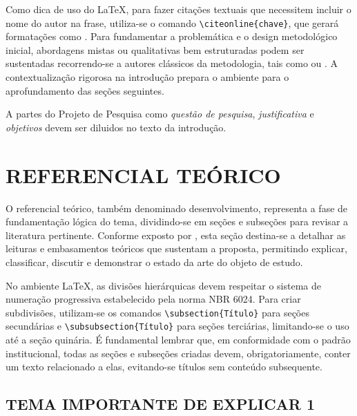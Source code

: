 Como dica de uso do LaTeX, para fazer citações textuais que necessitem incluir o nome do autor na frase, utiliza-se o comando \verb|\citeonline{chave}|, que gerará formatações como . Para fundamentar a problemática e o design metodológico inicial, abordagens mistas ou qualitativas bem estruturadas podem ser sustentadas recorrendo-se a autores clássicos da metodologia, tais como  ou . A contextualização rigorosa na introdução prepara o ambiente para o aprofundamento das seções seguintes.

A partes do Projeto de Pesquisa como \textit{questão de pesquisa}, \textit{justificativa} e \textit{objetivos} devem ser diluidos no texto da introdução.

\section{REFERENCIAL TEÓRICO}
\label{sec:referencial}

O referencial teórico, também denominado desenvolvimento, representa a fase de fundamentação lógica do tema, dividindo-se em seções e subseções para revisar a literatura pertinente. Conforme exposto por , esta seção destina-se a detalhar as leituras e embasamentos teóricos que sustentam a proposta, permitindo explicar, classificar, discutir e demonstrar o estado da arte do objeto de estudo. 

No ambiente LaTeX, as divisões hierárquicas devem respeitar o sistema de numeração progressiva estabelecido pela norma NBR 6024. Para criar subdivisões, utilizam-se os comandos \verb|\subsection{Título}| para seções secundárias e \verb|\subsubsection{Título}| para seções terciárias, limitando-se o uso até a seção quinária. É fundamental lembrar que, em conformidade com o padrão institucional, todas as seções e subseções criadas devem, obrigatoriamente, conter um texto relacionado a elas, evitando-se títulos sem conteúdo subsequente.

\subsection{TEMA IMPORTANTE DE EXPLICAR 1}
\label{subsec:fundamentacao1}

